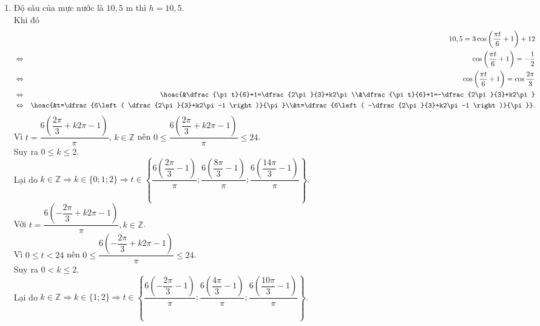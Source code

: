 \begin{ex}
{\begin{enumerate}
\begin{eqnarray*}
				&\Leftrightarrow& \dfrac{\pi t}{6}+1=\pi +k2\pi \\ &\Leftrightarrow& t=\dfrac{6\left( k2\pi  +\pi -1 \right)}{\pi} \quad \left( k\in \mathbb{Z} \right)
			\end{eqnarray*}
			Vì  $0\le t<24$ nên $0\le \dfrac{6(k2\pi +\pi -1)}{\pi}\le 24 \Leftrightarrow 0<k\le 1$.\\
			Lại do $k\in \mathbb{Z}\Rightarrow k=1\Rightarrow t=\dfrac{6\left( 3\pi  -1 \right)}{\pi }$.
			\item Độ  sâu của mực nước là $10{,}5$ m thì $h=10,5$.\\
			 Khi đó
			\begin{eqnarray*}
				&&10,5=3\cos \left( \dfrac{\pi  t}{6}+1 \right)+12 \\
				&\Leftrightarrow& \cos \left(  \dfrac{\pi t}{6}+1 \right) =-\dfrac{1}{2} \\
				&\Leftrightarrow& \cos \left( \dfrac{\pi t}{6}+1 \right)=\cos \dfrac{2\pi  }{3} \\
				 &\Leftrightarrow&
				\hoac{&\dfrac{\pi t}{6}+1=\dfrac{2\pi}{3}+k2\pi\\&\dfrac{\pi t}{6}+1=-\dfrac{2\pi}{3}+k2\pi} \\ 
				&\Leftrightarrow& 
				\hoac{&t=\dfrac{6\left( \dfrac{2\pi }{3}+k2\pi -1 \right)}{\pi }\\&t=\dfrac{6\left( -\dfrac{2\pi }{3}+k2\pi -1 \right)}{\pi  }}.
			\end{eqnarray*}
			Vì $t=\dfrac{6\left( \dfrac{2\pi }{3}+k2\pi -1 \right)}{\pi }$, $k\in \mathbb{Z}$ nên $0\le \dfrac{6\left( \dfrac{2\pi}{3}+k2\pi  -1 \right)}{\pi}\le 24$.\\
			Suy ra $0\le k\le 2$.\\ 
			Lại do $k\in \mathbb{Z}  \Rightarrow k\in \{0;1;2\} \Rightarrow t\in \left\{ \dfrac{6\left( \dfrac{2\pi }{3}-1 \right)}{\pi }; \dfrac{6\left( \dfrac{8\pi }{3}-1 \right)}{\pi }; \dfrac{6\left( \dfrac{14\pi }{3}-1 \right)}{\pi } \right\}$.\\
			Với  $t=\dfrac{6\left( -\dfrac{2\pi }{3}+k2\pi -1 \right)}{\pi }, k\in \mathbb{Z}$.\\
			Vì $0\le  t<24$ nên $0\le \dfrac{6\left( -\dfrac{2\pi }{3}+k2\pi -1 \right)}{\pi }\le 24$.\\
			 Suy ra $ 0<k\le 2$.\\
			Lại  do $k\in \mathbb{Z} \Rightarrow k\in \{1;2\} \Rightarrow t\in \left\{ \dfrac{6\left( -\dfrac{2\pi}{3}-1 \right)}{\pi}; \dfrac{6\left( \dfrac{4\pi}{3}-1 \right)}{\pi}; \dfrac{6\left( \dfrac{10\pi }{3}-1 \right)}{\pi } \right\}$.
		\end{enumerate}
	 }
\end{ex}

